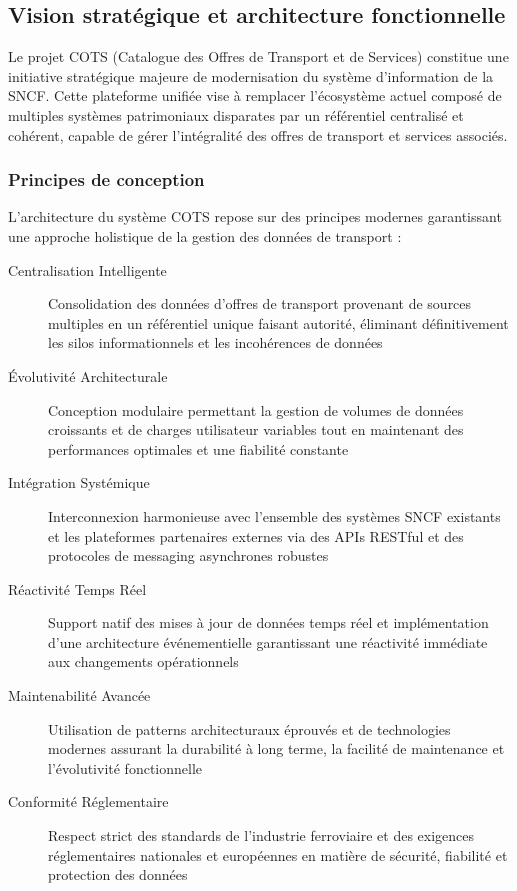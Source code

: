 \subsection{Vision stratégique et architecture fonctionnelle}

Le projet COTS (Catalogue des Offres de Transport et de Services) constitue une initiative stratégique majeure de modernisation du système d'information de la SNCF. Cette plateforme unifiée vise à remplacer l'écosystème actuel composé de multiples systèmes patrimoniaux disparates par un référentiel centralisé et cohérent, capable de gérer l'intégralité des offres de transport et services associés.

\subsubsection{Principes de conception}

L'architecture du système COTS repose sur des principes modernes garantissant une approche holistique de la gestion des données de transport :

\begin{description}
    \item[Centralisation Intelligente] Consolidation des données d'offres de transport provenant de sources multiples en un référentiel unique faisant autorité, éliminant définitivement les silos informationnels et les incohérences de données
    \item[Évolutivité Architecturale] Conception modulaire permettant la gestion de volumes de données croissants et de charges utilisateur variables tout en maintenant des performances optimales et une fiabilité constante
    \item[Intégration Systémique] Interconnexion harmonieuse avec l'ensemble des systèmes SNCF existants et les plateformes partenaires externes via des APIs RESTful et des protocoles de messaging asynchrones robustes
    \item[Réactivité Temps Réel] Support natif des mises à jour de données temps réel et implémentation d'une architecture événementielle garantissant une réactivité immédiate aux changements opérationnels
    \item[Maintenabilité Avancée] Utilisation de patterns architecturaux éprouvés et de technologies modernes assurant la durabilité à long terme, la facilité de maintenance et l'évolutivité fonctionnelle
    \item[Conformité Réglementaire] Respect strict des standards de l'industrie ferroviaire et des exigences réglementaires nationales et européennes en matière de sécurité, fiabilité et protection des données
\end{description}


